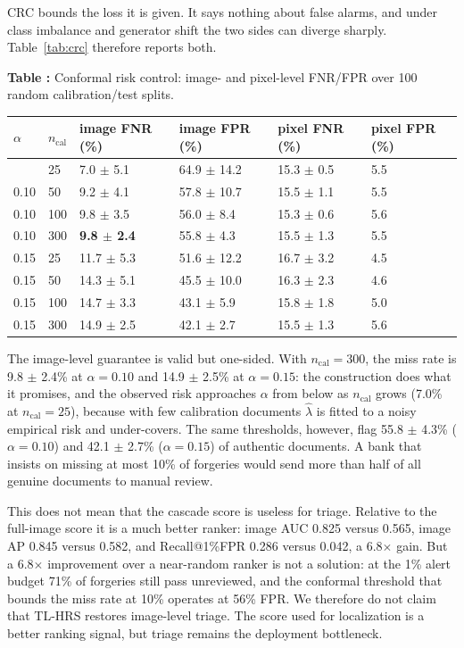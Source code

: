\documentclass[preprint,12pt]{elsarticle}
\newcounter{tabno}
\newcommand{\tabcaption}[1]{\par\needspace{9\baselineskip}\refstepcounter{tabno}\noindent\textbf{Table \thetabno:} #1\par\vspace{2pt}}
\begin{document}
CRC bounds the loss it is given. It says nothing about false alarms, and under class imbalance and generator shift the two sides can diverge sharply. Table~\ref{tab:crc} therefore reports both.

{
\tabcaption{Conformal risk control: image- and pixel-level FNR/FPR over 100 random calibration/test splits.}\label{tab:crc}
\begin{longtable}[]{@{}llllll@{}}
\toprule\noalign{}
$\alpha$ & $n_{\mathrm{cal}}$ & image FNR (\%) & image FPR (\%) & pixel FNR (\%) & pixel FPR (\%) \\
\midrule\noalign{}
\endhead
\bottomrule\noalign{}
\endlastfoot
0.10 & 25 & 7.0 $\pm$ 5.1 & 64.9 $\pm$ 14.2 & 15.3 $\pm$ 0.5 & 5.5 \\
0.10 & 50 & 9.2 $\pm$ 4.1 & 57.8 $\pm$ 10.7 & 15.5 $\pm$ 1.1 & 5.5 \\
0.10 & 100 & 9.8 $\pm$ 3.5 & 56.0 $\pm$ 8.4 & 15.3 $\pm$ 0.6 & 5.6 \\
0.10 & 300 & \textbf{9.8 $\pm$ 2.4} & 55.8 $\pm$ 4.3 & 15.5 $\pm$ 1.3 & 5.5 \\
0.15 & 25 & 11.7 $\pm$ 5.3 & 51.6 $\pm$ 12.2 & 16.7 $\pm$ 3.2 & 4.5 \\
0.15 & 50 & 14.3 $\pm$ 5.1 & 45.5 $\pm$ 10.0 & 16.3 $\pm$ 2.3 & 4.6 \\
0.15 & 100 & 14.7 $\pm$ 3.3 & 43.1 $\pm$ 5.9 & 15.8 $\pm$ 1.8 & 5.0 \\
0.15 & 300 & 14.9 $\pm$ 2.5 & 42.1 $\pm$ 2.7 & 15.5 $\pm$ 1.3 & 5.6 \\
\end{longtable}
}

The image-level guarantee is valid but one-sided. With $n_{\mathrm{cal}}=300$, the miss rate is 9.8 $\pm$ 2.4\% at $\alpha=0.10$ and 14.9 $\pm$ 2.5\% at $\alpha=0.15$: the construction does what it promises, and the observed risk approaches $\alpha$ from below as $n_{\mathrm{cal}}$ grows (7.0\% at $n_{\mathrm{cal}}=25$), because with few calibration documents $\hat{\lambda}$ is fitted to a noisy empirical risk and under-covers. The same thresholds, however, flag 55.8 $\pm$ 4.3\% ($\alpha=0.10$) and 42.1 $\pm$ 2.7\% ($\alpha=0.15$) of authentic documents. A bank that insists on missing at most 10\% of forgeries would send more than half of all genuine documents to manual review.

This does not mean that the cascade score is useless for triage. Relative to the full-image score it is a much better ranker: image AUC 0.825 versus 0.565, image AP 0.845 versus 0.582, and Recall@1\%FPR 0.286 versus 0.042, a 6.8$\times$ gain. But a 6.8$\times$ improvement over a near-random ranker is not a solution: at the 1\% alert budget 71\% of forgeries still pass unreviewed, and the conformal threshold that bounds the miss rate at 10\% operates at 56\% FPR. We therefore do not claim that TL-HRS restores image-level triage. The score used for localization is a better ranking signal, but triage remains the deployment bottleneck.
\end{document}
